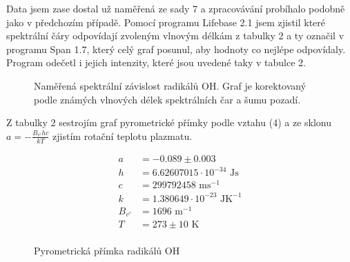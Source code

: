 \documentclass[a4paper,11pt]{article}
\begin{document}
Data jsem zase dostal už naměřená ze sady 7 a zpracovávání probíhalo podobně jako v předchozím případě. Pomocí programu Lifebase 2.1 jsem zjistil které spektrální čáry odpovídají zvoleným vlnovým délkám z tabulky 2 a ty označil v programu Span 1.7, který celý graf posunul, aby hodnoty co nejlépe odpovídaly. Program odečetl i jejich intenzity, které jsou uvedené taky v tabulce 2.


\begin{figure}[htpb]
    \centering
    \resizebox{0.8\textwidth}{!}{  }
    \vspace{40pt}
    \captionsetup{type=graph}
    \caption{Naměřená spektrální závislost radikálů OH. Graf je korektovaný podle známých vlnových délek spektrálních čar a šumu pozadí.}
\end{figure}

\begin{table}[htpb]
    \vspace{-20pt}
    \begin{minipage}[t]{.5\linewidth}
Z tabulky 2 sestrojím graf pyrometrické přímky podle vztahu (4) a ze sklonu $ a = -\frac{B_{v'} hc}{kT} $  zjistím rotační teplotu plazmatu. 


\begin{align*}
    a &= -0.089 \pm 0.003 \\
    h &= 6.62607015 \cdot 10^{-34} \text{ Js} \\
    c &= 299792458 \text{ ms}^{-1} \\
    k &= 1.380649 \cdot 10^{-23}  \text{ JK}^{-1} \\
    B_{v'} &= 1696 \text{ m}^{-1} \\
    T &= 273 \pm 10  \text{ K}\\
\end{align*}

    \end{minipage} 
    \hfill
    \begin{minipage}[t]{.5\linewidth}
        \centering

\begin{figure}[H]
    \vspace{-40pt}
    \centering
    
    \captionsetup{type=graph}
    \caption{Pyrometrická přímka radikálů OH}
\end{figure}


    \end{minipage} 
\end{table}
\end{document}
